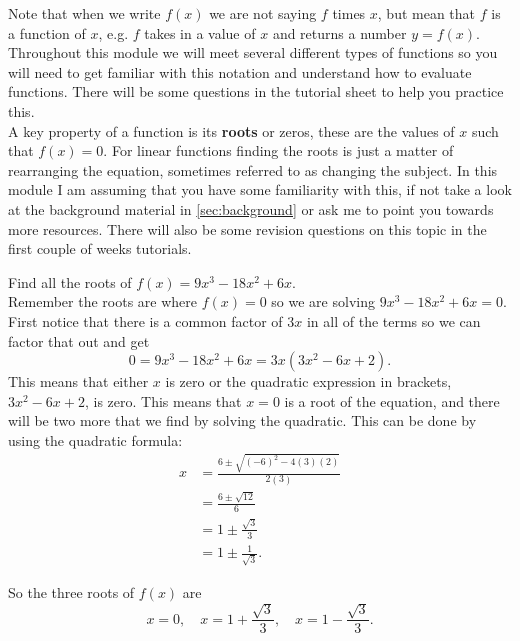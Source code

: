 Note that when we write $f(x)$ we are not saying $f$ times $x$, but mean that $f$ is a function of $x$, e.g. $f$ takes in a value of $x$ and returns a number $y=f(x)$.\\

Throughout this module we will meet several different types of functions so you will need to get familiar with this notation and understand how to evaluate functions. There will be some questions in the tutorial sheet to help you practice this.\\

A key property of a function is its \textbf{\gls{roots}} or zeros, these are the values of $x$ such that $f(x)=0$. For linear functions finding the roots is just a matter of rearranging the equation, sometimes referred to as changing the subject. In this module I am assuming that you have some familiarity with this, if not take a look at the background material in \cref{sec:background} or ask me to point you towards more resources. There will also be some revision questions on this topic in the first couple of weeks tutorials.

\begin{ex} Find all the roots of $f(x)=9x^{3}-18x^{2}+6x$.\\

Remember the roots are where $f(x)=0$ so we are solving $9x^{3}-18x^{2}+6x=0$. First notice that there is a common factor of $3x$ in all of the terms so we can factor that out and get
\begin{equation*}
0=9x^{3}-18x^{2}+6x=3x\left(3x^{2}-6x+2\right).
\end{equation*}
This means that either $x$ is zero or the quadratic expression in brackets, $3x^{2}-6x+2$, is zero. This means that $x=0$ is a root of the equation, and there will be two more that we find by solving the quadratic. This can be done by using the quadratic formula:
\begin{align*}
x&=\frac{6\pm\sqrt{(-6)^{2}-4(3)(2)}}{2(3)}\\
&=\frac{6\pm\sqrt{12}}{6}\\
&=1\pm\frac{\sqrt{3}}{3}\\
&=1\pm\frac{1}{\sqrt{3}}.
\end{align*}

So the three roots of $f(x)$ are
\begin{equation*}
x=0,\quad x=1+\frac{\sqrt{3}}{3},\quad x=1-\frac{\sqrt{3}}{3}.
\end{equation*}

\end{ex}

